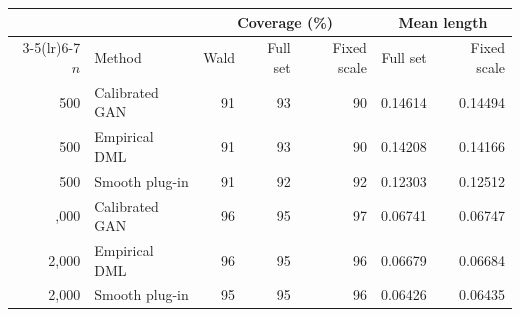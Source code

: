 {\small
\setlength{\tabcolsep}{4pt}
\begin{tabular}{rlrrrrr}
\toprule
& & \multicolumn{3}{c}{Coverage (\%)} & \multicolumn{2}{c}{Mean length} \\
\cmidrule(lr){3-5}\cmidrule(lr){6-7}
$n$ & Method & Wald & Full set & Fixed scale & Full set & Fixed scale \\
\midrule
500 & Calibrated GAN & 91 & 93 & 90 & 0.14614 & 0.14494 \\
500 & Empirical DML & 91 & 93 & 90 & 0.14208 & 0.14166 \\
500 & Smooth plug-in & 91 & 92 & 92 & 0.12303 & 0.12512 \\
\addlinespace
2,000 & Calibrated GAN & 96 & 95 & 97 & 0.06741 & 0.06747 \\
2,000 & Empirical DML & 96 & 95 & 96 & 0.06679 & 0.06684 \\
2,000 & Smooth plug-in & 95 & 95 & 96 & 0.06426 & 0.06435 \\
\bottomrule
\end{tabular}
}
